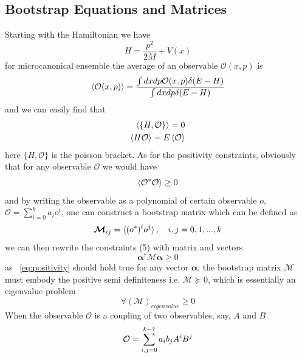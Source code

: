 \documentclass[aps,prl, preprint,amsmath, amssymb]{revtex4-2}
\begin{document}
\subsection{Bootstrap Equations and Matrices}
Starting with the Hamiltonian we have
\begin{equation}
    H = \frac{p^2}{2M} + V(x)\label{eq:hamiltonian}
\end{equation}
for microcanonical ensemble the average of an observable $\mathcal{O}(x, p)$ is
\begin{equation}
    \braket{\mathcal{O}(x, p)} = \frac{\int dxdp\mathcal{O}(x, p)\delta (E - H)}{\int dxdp\delta (E - H)}
\end{equation}
and we can easily find that
\begin{align}
    \braket{\{H, \mathcal{O}\}} = 0 \label{eq:beq0}\\
    \braket{H \mathcal{O}} = E \braket{\mathcal{O}} \label{eq:beq1}
\end{align}
here $\{H, \mathcal{O}\}$ is the poisson bracket.
As for the positivity constraints, obviously that for any observable $\mathcal{O}$ we would have
\begin{equation}
    \braket{\mathcal{O}^* \mathcal{O}} \geq 0 \label{eq:pos}
\end{equation}
and by writing the observable as a polynomial of certain observable $o$, $\mathcal{O} = \sum_{i = 0}^k a_i o^i$, one can construct a bootstrap matrix which can be defined as
\begin{equation}
    \bm{\mathcal{M}}_{ij} = \braket{(o^*)^i o^j}, \ \ \ i, j = 0, 1, ..., k
\end{equation}
we can then rewrite the constraints (5) with matrix and vectors
\begin{equation}
    \bm{\alpha}^\dagger \bm{\mathcal{M} \bm{\alpha}} \geq 0\label{eq:positivity}
\end{equation}
as ~\eqref{eq:positivity} should hold true for any vector $\bm{\alpha}$, the bootstrap matrix $\bm{\mathcal{M}}$ must embody the positive semi definiteness i.e. $\bm{\mathcal{M}} \succeq 0$, which is essentially an eigenvalue problem
\begin{equation}
    \forall (\bm{\mathcal{M}})_{eigenvalue} \geq 0
\end{equation}
When the observable $\mathcal{O}$ is a coupling of two observables, say, $A$ and $B$
\begin{equation}
    \mathcal{O} = \sum_{i, j = 0}^{k - 1} a_i b_j A^i B^j\\
\end{equation}
\end{document}
